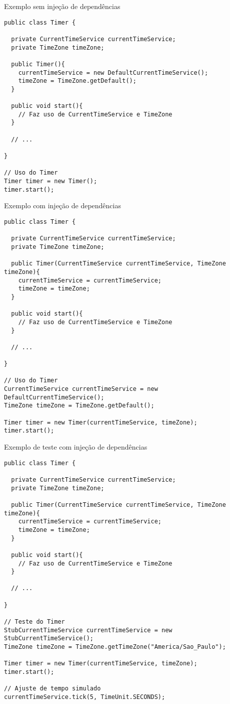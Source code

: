 \documentclass{beamer}
\begin{document}
\begin{frame}[fragile]{Exemplo sem injeção de dependências}
 \begin{verbatim}
public class Timer {

  private CurrentTimeService currentTimeService;
  private TimeZone timeZone;

  public Timer(){
    currentTimeService = new DefaultCurrentTimeService();
    timeZone = TimeZone.getDefault();
  }

  public void start(){
    // Faz uso de CurrentTimeService e TimeZone
  }
  
  // ...

}

// Uso do Timer
Timer timer = new Timer();
timer.start();
  \end{verbatim}
\end{frame}

\begin{frame}[fragile]{Exemplo com injeção de dependências}
 \begin{verbatim}
public class Timer {

  private CurrentTimeService currentTimeService;
  private TimeZone timeZone;

  public Timer(CurrentTimeService currentTimeService, TimeZone timeZone){
    currentTimeService = currentTimeService;
    timeZone = timeZone;
  }

  public void start(){
    // Faz uso de CurrentTimeService e TimeZone
  }
  
  // ...

}

// Uso do Timer
CurrentTimeService currentTimeService = new DefaultCurrentTimeService();
TimeZone timeZone = TimeZone.getDefault();

Timer timer = new Timer(currentTimeService, timeZone);
timer.start();
  \end{verbatim}
\end{frame}

\begin{frame}[fragile]{Exemplo de teste com injeção de dependências}
 \begin{verbatim}
public class Timer {

  private CurrentTimeService currentTimeService;
  private TimeZone timeZone;

  public Timer(CurrentTimeService currentTimeService, TimeZone timeZone){
    currentTimeService = currentTimeService;
    timeZone = timeZone;
  }

  public void start(){
    // Faz uso de CurrentTimeService e TimeZone
  }
  
  // ...

}

// Teste do Timer
StubCurrentTimeService currentTimeService = new StubCurrentTimeService();
TimeZone timeZone = TimeZone.getTimeZone("America/Sao_Paulo");

Timer timer = new Timer(currentTimeService, timeZone);
timer.start();

// Ajuste de tempo simulado
currentTimeService.tick(5, TimeUnit.SECONDS);
  \end{verbatim}
\end{frame}
\end{document}
